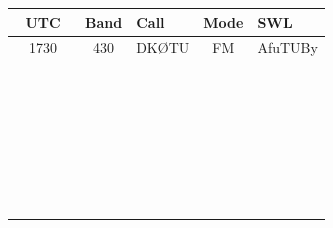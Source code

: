 \documentclass[a4paper,10pt]{article}
\begin{document}
    \begin{center}
    \renewcommand{\arraystretch}{1.5}
    \begin{tabular}{|c|c|l|c|l|}\hline
        \textbf{UTC} & \textbf{Band} & \textbf{Call} & \textbf{Mode} & \textbf{SWL} \\ \hline \hline
         ~~1730~~ & 430 & DKØTU & FM & AfuTUBy \\ \hline
         & & \hspace{2cm} & & \hspace{3.0cm} \\ \hline
         & & & & \\ \hline
         & & & & \\ \hline
         & & & & \\ \hline
         & & & & \\ \hline
         & & & & \\ \hline
         & & & & \\ \hline
         & & & & \\ \hline
         & & & & \\ \hline
         & & & & \\ \hline
         & & & & \\ \hline
         & & & & \\ \hline
         & & & & \\ \hline
         & & & & \\ \hline
         & & & & \\ \hline
         & & & & \\ \hline
         & & & & \\ \hline
         & & & & \\ \hline
         & & & & \\ \hline
         & & & & \\ \hline
         & & & & \\ \hline
         & & & & \\ \hline
         & & & & \\ \hline
         & & & & \\ \hline
         & & & & \\ \hline
         & & & & \\ \hline
         & & & & \\ \hline
         & & & & \\ \hline
         & & & & \\ \hline
         & & & & \\ \hline
    \end{tabular}
    \end{center}
\end{document}
